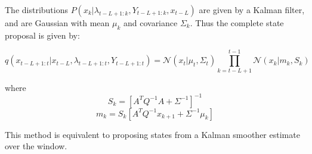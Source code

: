 The distributions $P(x_k|\lambda_{t-L+1:k}, Y_{t-L+1:k}, x_{t-L})$ are given by a Kalman filter, and are Gaussian with mean $\mu_k$ and covariance $\Sigma_k$. Thus the complete state proposal is given by:

\begin{equation}
q(x_{t-L+1:t}|x_{t-L}, \lambda_{t-L+1:t}, Y_{t-L+1:t}) = \mathcal{N}(x_t|\mu_t, \Sigma_t) \prod_{k=t-L+1}^{t-1} \mathcal{N}(x_k|m_k, S_k)
\label{eq:}
\end{equation}

where
\begin{equation}S_k = [ A^T Q^{-1} A + \Sigma^{-1} ]^{-1}\label{eq:}\end{equation}
\begin{equation}m_k = S_k [ A^T Q^{-1} x_{k+1} + \Sigma^{-1} \mu_k ]\label{eq:}\end{equation}

This method is equivalent to proposing states from a Kalman smoother estimate over the window.
